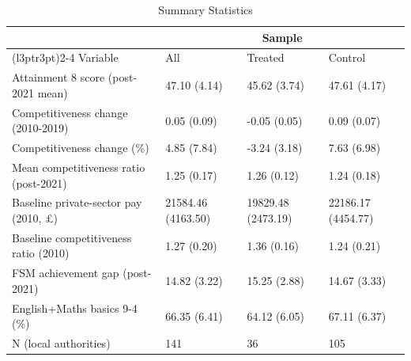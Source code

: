 \begin{table}[!h]
\centering
\caption{\label{tab:tab:summary}Summary Statistics}
\centering
\begin{tabular}[t]{llll}
\toprule
\multicolumn{1}{c}{ } & \multicolumn{3}{c}{Sample} \\
\cmidrule(l{3pt}r{3pt}){2-4}
Variable & All & Treated & Control\\
\midrule
Attainment 8 score (post-2021 mean) & 47.10 (4.14) & 45.62 (3.74) & 47.61 (4.17)\\
Competitiveness change (2010-2019) & 0.05 (0.09) & -0.05 (0.05) & 0.09 (0.07)\\
Competitiveness change (\%) & 4.85 (7.84) & -3.24 (3.18) & 7.63 (6.98)\\
Mean competitiveness ratio (post-2021) & 1.25 (0.17) & 1.26 (0.12) & 1.24 (0.18)\\
Baseline private-sector pay (2010, £) & 21584.46 (4163.50) & 19829.48 (2473.19) & 22186.17 (4454.77)\\
\addlinespace
Baseline competitiveness ratio (2010) & 1.27 (0.20) & 1.36 (0.16) & 1.24 (0.21)\\
FSM achievement gap (post-2021) & 14.82 (3.22) & 15.25 (2.88) & 14.67 (3.33)\\
English+Maths basics 9-4 (\%) & 66.35 (6.41) & 64.12 (6.05) & 67.11 (6.37)\\
N (local authorities) & 141 & 36 & 105\\
\bottomrule
\end{tabular}
\end{table}
